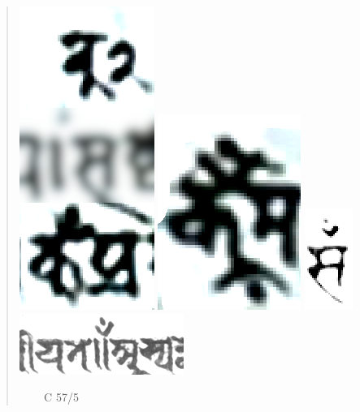 \begin{quote}
\hspace{3em} 
\includegraphics[scale=.2]{images/mspaperA227rkakapadablurred.png}
\hfill
\includegraphics[scale=.2]{images/doublekakapada_msPaperA238r.png	}
\hfill
\includegraphics[scale=.4]{images/C57_5_kakapada7v.png}
\hfill
\includegraphics[scale=.5]{images/dottedkakapada01.png}
\hspace{3em}

\hspace{2em}
\msPaperA\ \recto
\hspace{1.5em}
\msPaperA\ \recto\
\hspace{.7em}
C 57/5 \verso\
\hspace{2.4em}
\msNa\ \verso
\hspace{2em}
\end{quote}


